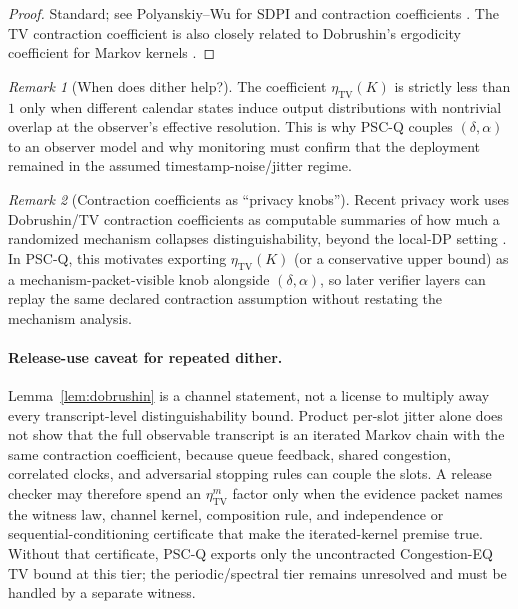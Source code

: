 \documentclass[11pt]{article}
\theoremstyle{definition}
\theoremstyle{remark}
\newtheorem{remark}{Remark}
\newcommand{\TV}{\mathrm{TV}}
\begin{document}
\begin{proof}
Standard; see Polyanskiy--Wu for SDPI and contraction coefficients \cite{polyanskiy_wu_sdpi}.
The TV contraction coefficient is also closely related to Dobrushin's ergodicity coefficient for Markov kernels \cite{dobrushin1956,delmoral2003}.
\end{proof}

\begin{remark}[When does dither help?]
The coefficient \(\eta_{\TV}(K)\) is strictly less than \(1\) only when different calendar states induce output distributions with nontrivial overlap at the observer's effective resolution.
This is why PSC-Q couples \((\delta,\alpha)\) to an observer model and why monitoring must confirm that the deployment remained in the assumed timestamp-noise/jitter regime.
\end{remark}

\begin{remark}[Contraction coefficients as ``privacy knobs'']
Recent privacy work uses Dobrushin/TV contraction coefficients as computable summaries of how much a randomized mechanism collapses distinguishability, beyond the local-DP setting \cite{grosse2026}.
In PSC-Q, this motivates exporting \(\eta_{\TV}(K)\) (or a conservative upper bound) as a mechanism-packet-visible knob alongside \((\delta,\alpha)\), so later verifier layers can replay the same declared contraction assumption without restating the mechanism analysis.
\end{remark}

\paragraph{Release-use caveat for repeated dither.}
Lemma~\ref{lem:dobrushin} is a channel statement, not a license to multiply away every transcript-level distinguishability bound.  Product per-slot jitter alone does not show that the full observable transcript is an iterated Markov chain with the same contraction coefficient, because queue feedback, shared congestion, correlated clocks, and adversarial stopping rules can couple the slots.  A release checker may therefore spend an \(\eta_{\TV}^m\) factor only when the evidence packet names the witness law, channel kernel, composition rule, and independence or sequential-conditioning certificate that make the iterated-kernel premise true.  Without that certificate, PSC-Q exports only the uncontracted Congestion-EQ TV bound at this tier; the periodic/spectral tier remains unresolved and must be handled by a separate witness.
\end{document}
